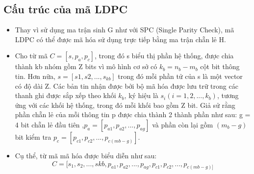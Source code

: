 \documentclass{article}
\begin{document}
\subsection{Cấu trúc của mã LDPC}
    \begin{itemize}
      \item Thay vì sử dụng ma trận sinh G như với SPC (Single Parity Check), mã LDPC có thể được mã hóa sử  dụng trực tiếp bằng ma trận chẵn lẻ H.

      \item Cho từ mã $C = [s, p_a, p_c]$, trong đó s biểu thị phần hệ thống, được chia thành kb nhóm gồm Z bits vì mô hình cơ sở có $k_b = n_b - m_b$ cột bit thông tin. Hơn nữa, $s=[s1,s2,...,s_{kb}]$ trong đó mỗi phần tử của s là một vector có độ dài Z. Các bản tin nhận được bởi bộ mã hóa được lưu trữ trong các thanh ghi được sắp xếp theo khối $k_b$, ký hiệu là $s_i (i = 1, 2, ..., k_b)$, tương ứng với các khối hệ thống, trong đó mỗi khối bao gồm Z bit. Giả sử rằng phần chẵn lẻ của mỗi thông tin p được chia thành 2 thành phần như sau: g = 4 bit chẵn lẻ đầu tiên ,$p_a=[p_{a1}, p_{a2},...,p_{ag}]$ và phần còn lại gồm $(m_b-g)$ bit kiểm tra $p_c=[p_{c1} ,p_{c2},...,p_{c(mb-g)}]$.
      
      \item  Cụ thể, từ mã mã hóa được biểu diễn như sau:
      \begin{equation}\label{pt12}
         C = [s_1,s_2,...,skb, p_{a1}, p_{a2},...,p_{ag}, p_{c1}, p_{c2},...,p_{c(mb-g)]}
      \end{equation}
      

\end{itemize}
\end{document}
